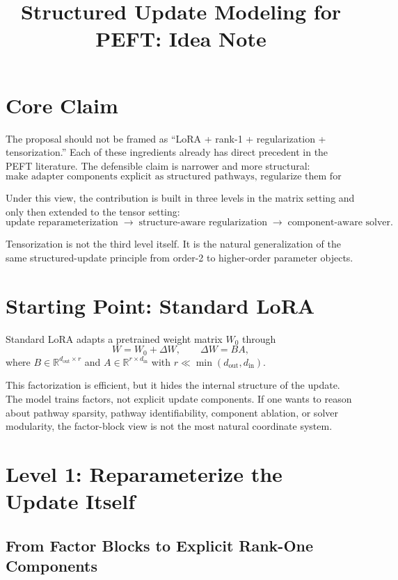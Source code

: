 \documentclass[11pt]{article}
\title{\textbf{Structured Update Modeling for PEFT: Idea Note}}
\author{}
\date{}
\begin{document}
\maketitle

\section{Core Claim}

The proposal should not be framed as ``LoRA + rank-1 + regularization + tensorization.'' Each of these ingredients already has direct precedent in the PEFT literature. The defensible claim is narrower and more structural:
\[
\text{make adapter components explicit as structured pathways, regularize them for identifiability, and optimize them as first-class objects.}
\]

Under this view, the contribution is built in three levels in the matrix setting and only then extended to the tensor setting:
\[
\text{update reparameterization} \;\rightarrow\; \text{structure-aware regularization} \;\rightarrow\; \text{component-aware solver}.
\]

Tensorization is not the third level itself. It is the natural generalization of the same structured-update principle from order-2 to higher-order parameter objects.

\section{Starting Point: Standard LoRA}

Standard LoRA adapts a pretrained weight matrix $W_0$ through
\[
W = W_0 + \Delta W,\qquad \Delta W = BA,
\]
where $B \in \mathbb{R}^{d_{\text{out}} \times r}$ and $A \in \mathbb{R}^{r \times d_{\text{in}}}$ with $r \ll \min(d_{\text{out}}, d_{\text{in}})$.

This factorization is efficient, but it hides the internal structure of the update. The model trains factors, not explicit update components. If one wants to reason about pathway sparsity, pathway identifiability, component ablation, or solver modularity, the factor-block view is not the most natural coordinate system.

\section{Level 1: Reparameterize the Update Itself}

\subsection{From Factor Blocks to Explicit Rank-One Components}
\end{document}
